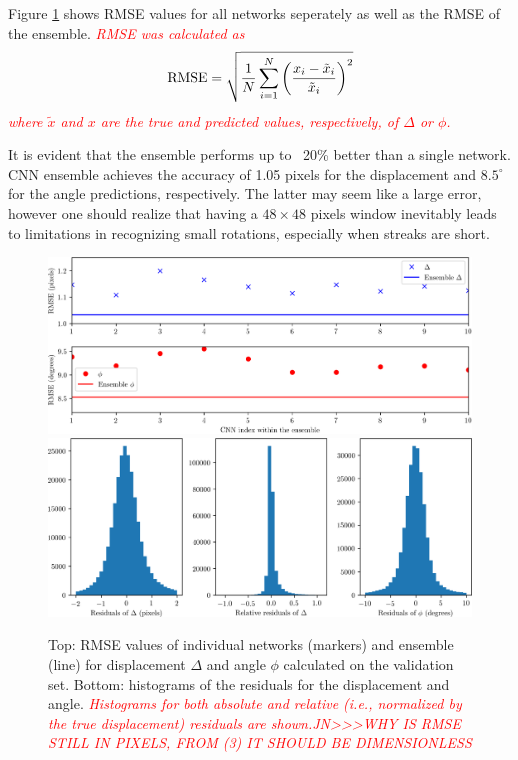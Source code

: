 \documentclass{svjour3}                     %
\newcommand{\new}[1]{\textit{\textcolor{red}{#1}}}
\begin{document}
Figure \ref{fig:fig3} shows RMSE values for all networks seperately as well as the RMSE of the ensemble. \new{RMSE was calculated as} 
\begin{equation}
\textnormal{RMSE} = \sqrt{\frac{1}{N}\sum_{i = 1}^N{\left(\frac{x_i - \tilde{x}_i}{\tilde{x}_i}\right)^2}}
\end{equation}
\new{where $\tilde{x}$ and $x$ are the true and predicted values, respectively, of $\Delta$ or $\phi$.}

It is evident that the ensemble performs up to ~20\% better than a single network. CNN ensemble achieves the accuracy of 1.05 pixels for the displacement and $8.5^{\circ}$ for the angle predictions, respectively. The latter may seem like a large error, however one should realize that having a $48 \times 48$ pixels window inevitably leads to limitations in recognizing small rotations, especially when streaks are short. 

\begin{figure}
\includegraphics[width=\textwidth]{figs/figure2a.png}
\includegraphics[width=\textwidth]{figs/figure2b.png}
\caption{Top: RMSE values of individual networks (markers) and ensemble (line) for displacement $\Delta$ and angle $\phi$ calculated on the validation set. Bottom: histograms of the residuals for the displacement and angle. \new{Histograms for both absolute and relative (i.e., normalized by the true displacement) residuals are shown.JN>>>WHY IS RMSE STILL IN PIXELS, FROM (3) IT SHOULD BE DIMENSIONLESS}}
\label{fig:fig3}
\end{figure}
\end{document}
